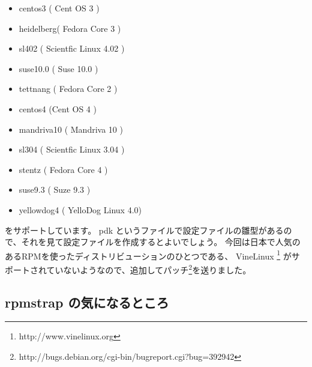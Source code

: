 \documentclass[mingoth,a4paper]{jsarticle}
\begin{document}
\begin{itemize}
\item centos3 ( Cent OS 3 )
\item heidelberg( Fedora Core 3 )  
\item sl402 ( Scientfic Linux 4.02 )       
\item suse10.0  ( Suse 10.0 )
\item tettnang ( Fedora Core 2 )
\item centos4  (Cent OS 4 )   
\item mandriva10 ( Mandriva 10 )
\item sl304  ( Scientfic Linux 3.04 )    
\item stentz ( Fedora Core 4 )  
\item suse9.3  ( Suze 9.3 )   
\item yellowdog4 ( YelloDog Linux 4.0)
\end{itemize}

をサポートしています。
pdk というファイルで設定ファイルの雛型があるので、それを見て設定ファイルを作成するとよいでしょう。
今回は日本で人気のあるRPMを使ったディストリビューションのひとつである、 VineLinux \footnote{http://www.vinelinux.org} 
がサポートされていないようなので、追加してパッチ\footnote{http://bugs.debian.org/cgi-bin/bugreport.cgi?bug=392942}を送りました。

\subsection{rpmstrap の気になるところ}
\end{document}
